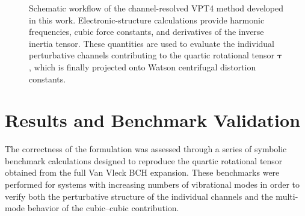 \documentclass[aip,jcp,reprint]{revtex4-2}
\begin{document}
\begin{figure}[t]
\centering
{}

\caption{
Schematic workflow of the channel-resolved VPT4 method developed in this work.
Electronic-structure calculations provide harmonic frequencies,
cubic force constants, and derivatives of the inverse inertia tensor.
These quantities are used to evaluate the individual perturbative
channels contributing to the quartic rotational tensor
$\bm{\tau}$, which is finally projected onto Watson centrifugal
distortion constants.
}

\label{fig:workflow}
\end{figure}

\section{Results and Benchmark Validation}

The correctness of the formulation was assessed through
a series of symbolic benchmark calculations designed to reproduce the
quartic rotational tensor obtained from the full Van Vleck BCH expansion.
These benchmarks were performed for systems with increasing numbers of
vibrational modes in order to verify both the perturbative structure of
the individual channels and the multi-mode behavior of the cubic--cubic
contribution.
\end{document}
